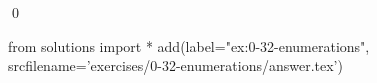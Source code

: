 
\begin{ex}
  \label{ex:0-32-enumerations}
  
  \qed
\end{ex}
\begin{python0}
from solutions import *
add(label="ex:0-32-enumerations",
    srcfilename='exercises/0-32-enumerations/answer.tex')
\end{python0}
